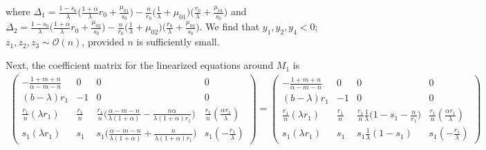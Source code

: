 \documentclass[a4paper,11pt]{article}
\def\BO{{\mathcal{O}}}
\theoremstyle{remark}
\begin{document}
where $\Delta_1 = \frac{1-s_0}{\lambda}\big(\frac{1+\alpha}{\lambda}r_0 + \frac{\mu_{01}}{s_0}\big) -\frac{n}{r_0} \big( \frac{1}{\lambda} + \mu_{01}\big)\big(\frac{r_0}{\lambda} + \frac{\mu_{01}}{s_0}\big)$
and $\Delta_2 = \frac{1-s_0}{\lambda}\big(\frac{1+\alpha}{\lambda}r_0 + \frac{\mu_{02}}{s_0}\big) -\frac{n}{r_0} \big( \frac{1}{\lambda} + \mu_{02}\big)\big(\frac{r_0}{\lambda} + \frac{\mu_{02}}{s_0}\big)$.
We find that $y_1,y_2,y_4<0$; $z_1,z_2,z_3 \sim\BO(n)$, provided $n$ is sufficiently small.

Next, the coefficient matrix for the linearized equations around $M_1$ is
\begin{align*}
 \begin{pmatrix}
          -\frac{1+m+n}{\alpha-m-n} & 0 & 0 & 0\\
          (b-\lambda)r_1 & -1 & 0 & 0\\
          \frac{r_1}{n}(\lambda r_1) & \frac{r_1}{n} & \frac{r_1}{n}\Big(\frac{\alpha-m-n}{\lambda(1+\alpha)} - \frac{n\alpha}{\lambda(1+\alpha)r_1}\Big) & \frac{r_1}{n}(\frac{\alpha r_1}{\lambda})\\
          s_1(\lambda r_1) & s_1 & s_1\Big(\frac{\alpha-m-n}{\lambda(1+\alpha)} + \frac{n}{\lambda(1+\alpha)r_1}\Big) & s_1(-\frac{r_1}{\lambda})
         \end{pmatrix}
         =\begin{pmatrix}
          -\frac{1+m+n}{\alpha-m-n} & 0 & 0 & 0\\
          (b-\lambda)r_1 & -1 & 0 & 0\\
          \frac{r_1}{n}(\lambda r_1) & \frac{r_1}{n} & \frac{r_1}{n}\frac{1}{\lambda}\Big(1-s_1-\frac{n}{r_1}\Big) & \frac{r_1}{n}(\frac{\alpha r_1}{\lambda})\\
          s_1(\lambda r_1) & s_1 & s_1\frac{1}{\lambda}(1-s_1) & s_1(-\frac{r_1}{\lambda})
         \end{pmatrix}
\end{align*}
\end{document}
